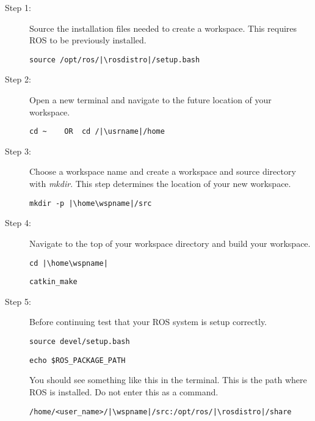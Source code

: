 \documentclass[12pt]{article}
\newcommand{\R}{\color{red}}
\newcommand{\B}{\color{blue}}
\newcommand{\K}{\color{black}}
\newcommand{\usrname}{\B<user\_name>\K}
\newcommand{\wspname}{\R<workspace\_name>\K}
\newcommand{\home}{\textasciitilde/}
\newcommand{\rosdistro}{melodic}
\begin{document}
\begin{itemize}
\begin{description}
		\item[Step 1:] Source the installation files needed to create a workspace. This requires ROS to be previously installed.
\begin{verbatim}
source /opt/ros/|\rosdistro|/setup.bash
\end{verbatim}

\item[Step 2:] Open a new terminal and navigate to the future location of your workspace.
\begin{verbatim}
cd ~	OR	cd /|\usrname|/home
\end{verbatim}

\item[Step 3:] Choose a workspace name and create a workspace and source directory with {\it mkdir}. This step determines the location of your new workspace.
\begin{verbatim}
mkdir -p |\home\wspname|/src
\end{verbatim}

\newpage

\item[Step 4:] Navigate to the top of your workspace directory and build your workspace.
\begin{verbatim}
cd |\home\wspname|
\end{verbatim}

\begin{verbatim}
catkin_make
\end{verbatim}

\item [Step 5:]Before continuing test that your ROS system is setup correctly.
\begin{verbatim}
source devel/setup.bash
\end{verbatim}

\begin{verbatim} 
echo $ROS_PACKAGE_PATH
\end{verbatim}

You should see something like this in the terminal. This is the path where ROS is installed. Do not enter this as a command.
\begin{verbatim} 
/home/<user_name>/|\wspname|/src:/opt/ros/|\rosdistro|/share
\end{verbatim}


\end{description}
\end{itemize}
\end{document}
